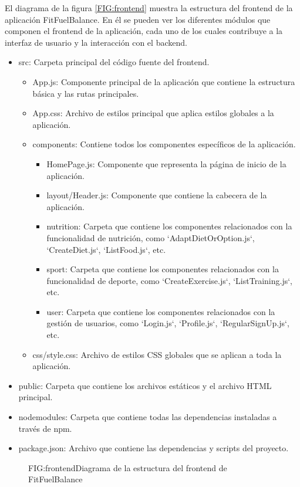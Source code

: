 El diagrama de la figura \ref{FIG:frontend} muestra la estructura del frontend de la aplicación FitFuelBalance. En él se pueden ver los diferentes módulos que componen el frontend de la aplicación, cada uno de los cuales contribuye a la interfaz de usuario y la interacción con el backend.

\begin{itemize}
  \item src: Carpeta principal del código fuente del frontend.
    \begin{itemize}
      \item App.js: Componente principal de la aplicación que contiene la estructura básica y las rutas principales.
      \item App.css: Archivo de estilos principal que aplica estilos globales a la aplicación.
      \item components: Contiene todos los componentes específicos de la aplicación.
        \begin{itemize}
          \item HomePage.js: Componente que representa la página de inicio de la aplicación.
          \item layout/Header.js: Componente que contiene la cabecera de la aplicación.
          \item nutrition: Carpeta que contiene los componentes relacionados con la funcionalidad de nutrición, como `AdaptDietOrOption.js`, `CreateDiet.js`, `ListFood.js`, etc.
          \item sport: Carpeta que contiene los componentes relacionados con la funcionalidad de deporte, como `CreateExercise.js`, `ListTraining.js`, etc.
          \item user: Carpeta que contiene los componentes relacionados con la gestión de usuarios, como `Login.js`, `Profile.js`, `RegularSignUp.js`, etc.
        \end{itemize}
      \item css/style.css: Archivo de estilos CSS globales que se aplican a toda la aplicación.
    \end{itemize}
  \item public: Carpeta que contiene los archivos estáticos y el archivo HTML principal.
  \item nodemodules: Carpeta que contiene todas las dependencias instaladas a través de npm.
  \item package.json: Archivo que contiene las dependencias y scripts del proyecto.
\end{itemize}

\begin{figure}[Diagrama de la estructura del frontend]{FIG:frontend}{Diagrama de la estructura del frontend de FitFuelBalance}
\end{figure}

